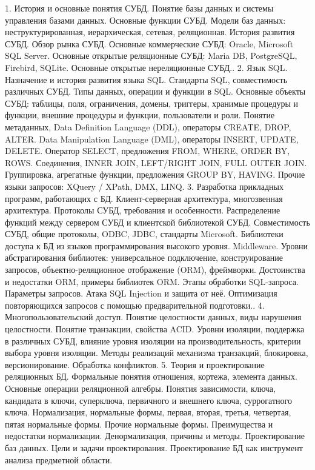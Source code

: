 \documentclass[a4paper]{article}
\begin{document}
1.	История и основные понятия СУБД.
	Понятие базы данных и системы управления базами данных. Основные функции СУБД. Модели баз данных: неструктурированная, иерархическая, сетевая, реляционная. История развития СУБД. Обзор рынка СУБД.
	Основные коммерческие СУБД: Oracle, Microsoft SQL Server.
	Основные открытые реляционные СУБД: Maria DB, PostgreSQL, Firebird, SQLite.
	Основные открытые нереляционные СУБД..
2.	Язык SQL.
	Назначение и история развития языка SQL.
	Стандарты SQL, совместимость различных СУБД.
	Типы данных, операции и функции в SQL.
	Основные объекты СУБД: таблицы, поля, ограничения, домены, триггеры, хранимые процедуры и функции, внешние процедуры и функции, пользователи и роли.
	Понятие метаданных, Data Definition Language (DDL), операторы CREATE, DROP, ALTER.
	Data Manipulation Language (DML), операторы INSERT, UPDATE, DELETE.
	Оператор SELECT, предложения FROM, WHERE, ORDER BY, ROWS. Соединения, INNER JOIN, LEFT/RIGHT JOIN, FULL OUTER JOIN. Группировка, агрегатные функции, предложения GROUP BY, HAVING.
	Прочие языки запросов: XQuery / XPath, DMX, LINQ.
3.	Разработка прикладных программ, работающих с БД.
	Клиент-серверная архитектура, многозвенная архитектура. Протоколы СУБД, требования и особенности. Распределение функций между сервером СУБД и клиентской библиотекой СУБД. Совместимость СУБД, общие протоколы, ODBC, JDBC, стандарты Microsoft.
	Библиотеки доступа к БД из языков программирования высокого уровня. Middleware. Уровни абстрагирования библиотек: универсальное подключение, конструирование запросов, объектно-реляционное отображение (ORM), фреймворки. Достоинства и недостатки ORM, примеры библиотек ORM.
	Этапы обработки SQL-запроса. Параметры запросов. Атака SQL Injection и защита от неё. Оптимизация повторяющихся запросов с помощью предварительной подготовки..
4.	Многопользовательский доступ.
	Понятие целостности данных, виды нарушения целостности.
	Понятие транзакции, свойства ACID.
	Уровни изоляции, поддержка в различных СУБД, влияние уровня изоляции на производительность, критерии выбора уровня изоляции.
	Методы реализаций механизма транзакций, блокировка, версионирование. Обработка конфликтов.
5.	Теория и проектирование реляционных БД.
	Формальные понятия отношения, кортежа, элемента данных. Основные операции реляционной алгебры.
	Понятия зависимости, ключа, кандидата в ключи, суперключа, первичного и внешнего ключа, суррогатного ключа.
	Нормализация, нормальные формы, первая, вторая, третья, четвертая, пятая нормальные формы. Прочие нормальные формы.
	Преимущества и недостатки нормализации. Денормализация, причины и методы.
	Проектирование баз данных. Цели и задачи проектирования. Проектирование БД как инструмент анализа предметной области.
\end{document}

